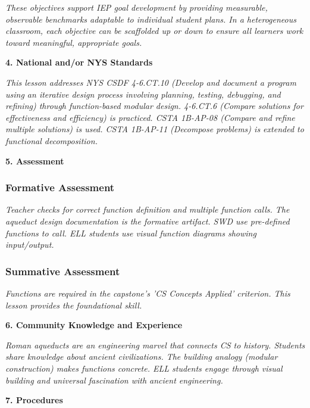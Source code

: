 \documentclass[11pt,letterpaper]{article}
\begin{document}
\textit{These objectives support IEP goal development by providing measurable, observable benchmarks adaptable to individual student plans. In a heterogeneous classroom, each objective can be scaffolded up or down to ensure all learners work toward meaningful, appropriate goals.}

\textbf{4. National and/or NYS Standards}

\textit{This lesson addresses NYS CSDF 4-6.CT.10 (Develop and document a program using an iterative design process involving planning, testing, debugging, and refining) through function-based modular design. 4-6.CT.6 (Compare solutions for effectiveness and efficiency) is practiced. CSTA 1B-AP-08 (Compare and refine multiple solutions) is used. CSTA 1B-AP-11 (Decompose problems) is extended to functional decomposition.}

\newpage
\textbf{5. Assessment}

\subsubsection{Formative Assessment}

\textit{Teacher checks for correct function definition and multiple function calls. The aqueduct design documentation is the formative artifact. SWD use pre-defined functions to call. ELL students use visual function diagrams showing input/output.}

\subsubsection{Summative Assessment}

\textit{Functions are required in the capstone's 'CS Concepts Applied' criterion. This lesson provides the foundational skill.}

\textbf{6. Community Knowledge and Experience}

\textit{Roman aqueducts are an engineering marvel that connects CS to history. Students share knowledge about ancient civilizations. The building analogy (modular construction) makes functions concrete. ELL students engage through visual building and universal fascination with ancient engineering.}

\textbf{7. Procedures}
\end{document}
